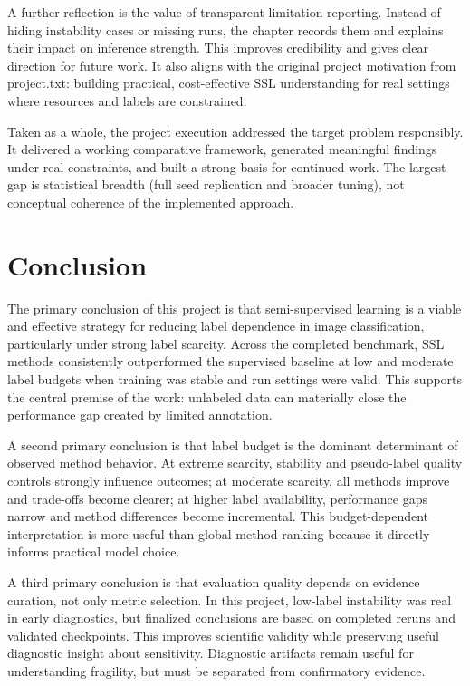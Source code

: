 A further reflection is the value of transparent limitation reporting. Instead of hiding instability cases or missing runs, the chapter records them and explains their impact on inference strength. This improves credibility and gives clear direction for future work. It also aligns with the original project motivation from project.txt: building practical, cost-effective SSL understanding for real settings where resources and labels are constrained.

Taken as a whole, the project execution addressed the target problem responsibly. It delivered a working comparative framework, generated meaningful findings under real constraints, and built a strong basis for continued work. The largest gap is statistical breadth (full seed replication and broader tuning), not conceptual coherence of the implemented approach.

\section{Conclusion}

The primary conclusion of this project is that semi-supervised learning is a viable and effective strategy for reducing label dependence in image classification, particularly under strong label scarcity. Across the completed benchmark, SSL methods consistently outperformed the supervised baseline at low and moderate label budgets when training was stable and run settings were valid. This supports the central premise of the work: unlabeled data can materially close the performance gap created by limited annotation.

A second primary conclusion is that label budget is the dominant determinant of observed method behavior. At extreme scarcity, stability and pseudo-label quality controls strongly influence outcomes; at moderate scarcity, all methods improve and trade-offs become clearer; at higher label availability, performance gaps narrow and method differences become incremental. This budget-dependent interpretation is more useful than global method ranking because it directly informs practical model choice.

A third primary conclusion is that evaluation quality depends on evidence curation, not only metric selection. In this project, low-label instability was real in early diagnostics, but finalized conclusions are based on completed reruns and validated checkpoints. This improves scientific validity while preserving useful diagnostic insight about sensitivity. Diagnostic artifacts remain useful for understanding fragility, but must be separated from confirmatory evidence.

